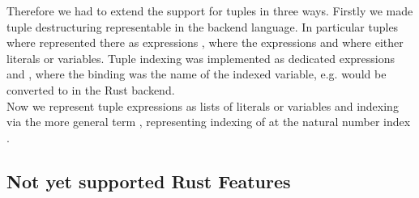 Therefore we had to extend the support for tuples in three ways. 
Firstly we made tuple destructuring representable in the backend language. In particular tuples where represented there as expressions , where the expressions  and  where either literals or variables. Tuple indexing was implemented as dedicated expressions  and , where the binding  was the name of the indexed variable, e.g.  would be converted to  in the Rust backend.\\

Now we represent tuple expressions as lists of literals or variables  and indexing via the more general term , representing indexing of  at the natural number index . \\






\subsection{Not yet supported Rust Features}

